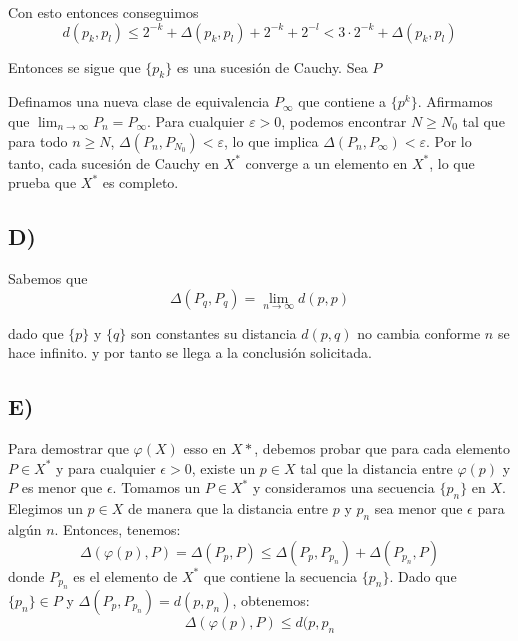 \documentclass[12pt]{article}
\newenvironment{sol}[1][Solución]{\begin{trivlist}
\item[\hskip \labelsep {\bfseries #1:}]}{\end{trivlist}}
\begin{document}
\begin{sol}
  Con esto entonces conseguimos \[
    d(p_k, p_l) \le 2^{-k} + \Delta(p_k, p_l) + 2^{-k} + 2^{-l} < 3\cdot 2^{-k} + \Delta(p_k, p_l)
  \]

  Entonces se sigue que $\{p_k\}$ es una sucesión de Cauchy. Sea $P$

  Definamos una nueva clase de equivalencia $P_\infty$ que contiene a $\{p^{k}\}$. Afirmamos que $\displaystyle\lim_{n \to \infty} P_n = P_\infty$. Para cualquier $\varepsilon > 0$, podemos encontrar $N \geq N_0$ tal que para todo $n \geq N$, $\Delta(P_n, P_{N_0}) < \varepsilon$, lo que implica $\Delta(P_n, P_\infty) < \varepsilon$. Por lo tanto, cada sucesión de Cauchy en $X^*$ converge a un elemento en $X^*$, lo que prueba que $X^*$ es completo.

  \subsection*{D)}

  Sabemos que \[
    \Delta(P_q, P_q) = \displaystyle\lim_{n\to\infty} d(p,p)
  \]

  dado que $\{p\}$ y $\{q\}$ son constantes su distancia $d(p,q)$ no cambia conforme $n$ se hace infinito. y por tanto se llega a la conclusión solicitada.

  \subsection*{E)}
  Para demostrar que \( \varphi(X) \) esso en \( X* \), debemos probar que para cada elemento \( P \in X^* \) y para cualquier \( \epsilon > 0 \), existe un \( p \in X \) tal que la distancia entre \( \varphi(p) \) y \( P \) es menor que \( \epsilon \).
  Tomamos un \( P \in X^* \) y consideramos una secuencia \( \{p_n\} \) en \( X \). Elegimos un \( p \in X \) de manera que la distancia entre \( p \) y \( p_n \) sea menor que \( \epsilon \) para algún \( n \). Entonces, tenemos:
  \[ \Delta(\varphi(p), P) = \Delta(P_{p}, P) \leq \Delta(P_{p}, P_{p_n}) + \Delta(P_{p_n}, P) \]
  donde \( P_{p_n} \) es el elemento de \( X^* \) que contiene la secuencia \( \{p_n\} \). Dado que \( \{p_n\} \in P \) y \( \Delta(P_{p}, P_{p_n}) = d(p, p_n) \), obtenemos:
  \[ \Delta(\varphi(p), P) \leq d(p, p_n \]
\end{sol}
\end{document}
